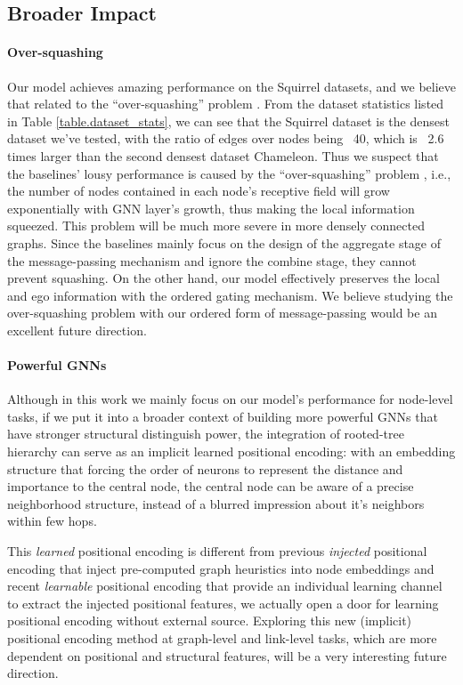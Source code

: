 \documentclass{article}
\begin{document}
\subsection{Broader Impact}
\label{Impact}

\paragraph{Over-squashing}
Our model achieves amazing performance on the Squirrel datasets, and we believe that related to the ``over-squashing'' problem \citep{alon2020bottleneck,topping2021understanding}. From the dataset statistics listed in Table \ref{table.dataset_stats}, we can see that the Squirrel dataset is the densest dataset we've tested, with the ratio of edges over nodes being ~40, which is ~2.6 times larger than the second densest dataset Chameleon. Thus we suspect that the baselines' lousy performance is caused by the ``over-squashing'' problem \citep{alon2020bottleneck,topping2021understanding}, i.e., the number of nodes contained in each node's receptive field will grow exponentially with GNN layer's growth, thus making the local information squeezed. This problem will be much more severe in more densely connected graphs. Since the baselines mainly focus on the design of the aggregate stage of the message-passing mechanism and ignore the combine stage, they cannot prevent squashing. On the other hand, our model effectively preserves the local and ego information with the ordered gating mechanism. We believe studying the over-squashing problem with our ordered form of message-passing would be an excellent future direction.


\paragraph{Powerful GNNs}
Although in this work we mainly focus on our model's performance for node-level tasks, if we put it into a broader context of building more powerful GNNs \citep{xu2018powerful} that have stronger structural distinguish power, the integration of rooted-tree hierarchy can serve as an implicit learned positional encoding: with an embedding structure that forcing the order of neurons to represent the distance and importance to the central node, the central node can be aware of a precise neighborhood structure, instead of a blurred impression about it's neighbors within few hops.

This \textit{learned} positional encoding is different from previous \textit{injected} positional encoding \citep{zhang2018link,you2019position,li2020distance,bouritsas2022improving} that inject pre-computed graph heuristics into node embeddings and recent \textit{learnable} positional encoding \citep{dwivedi2021graph,wang2022equivariant} that provide an individual learning channel to extract the injected positional features, we actually open a door for learning positional encoding without external source. Exploring this new (implicit) positional encoding method at graph-level and link-level tasks, which are more dependent on positional and structural features, will be a very interesting future direction.
\end{document}
